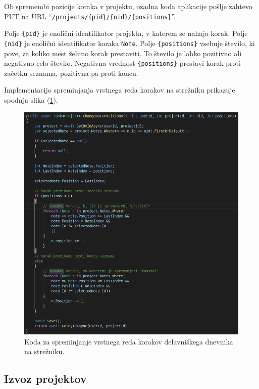\documentclass[a4paper, 12pt]{book}
\begin{document}
Ob spremembi pozicije koraka v projektu, ozadna koda aplikacije pošlje zahtevo PUT na URL \enquote{\texttt{/projects/\{pid\}/\{nid\}/\{positions\}}}.

Polje \texttt{\{pid\}} je enolični identifikator projekta, v katerem se nahaja korak.
Polje \texttt{\{nid\}} je enolični identifikator koraka \texttt{Note}.
Polje \texttt{\{positions\}} vsebuje število, ki pove, za koliko mest želimo korak prestaviti.
To število je lahko pozitivno ali negativno celo število.
Negativna vrednost \texttt{\{positions\}} prestavi korak proti začetku seznama, pozitivna pa proti koncu.

Implementacijo spreminjanja vrstnega reda korakov na strežniku prikazuje spodnja slika (\ref{api_code_changepos}).

\clearpage

\begin{figure}[H]
\begin{center}
	\includegraphics[width=13.5cm]{api_code_changepos}
\end{center}
	\caption{Koda za spreminjanje vrstnega reda korakov delavniškega dnevnika na strežniku.}
\label{api_code_changepos}
\end{figure}



\subsection{Izvoz projektov}
\end{document}
